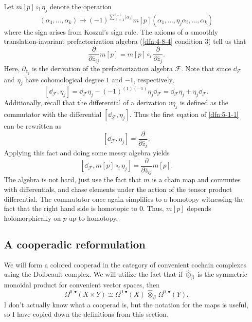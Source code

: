 Let $m[p]\circ _i \eta _j$ denote the operation
\[
	(\alpha _1, \ldots , \alpha _k) \mapsto (-1)^{\sum_{\ell=1}^{i-1} \left| \alpha _\ell  \right| } m[p](\alpha _1, \ldots , \eta _j\alpha _i, \ldots ,\alpha _k)
\]
where the sign arises from Koszul's sign rule. The axioms of a smoothly translation-invariant prefactorization algebra (\cref{dfn:4-8-4} condition 3) tell us that
\[
	\frac{\partial }{\partial \overline{z} _{ij} } m[p] = m[p]\circ _i \frac{\partial }{\partial \overline{z} _{j} } 
.\]
Here, $\partial _{\overline{z} _j} $ is the derivation of the prefactorization algebra $\mathcal{F} $. Note that since $\dd_{\mathcal{F} }$ and $\eta _j$ have cohomological degree $1$ and $-1$, respectively,
\[
	[\dd_{\mathcal{F} },\eta _j] = \dd_{\mathcal{F} }\eta _j - (-1)^{(1)(-1)} \eta _j \dd_{\mathcal{F} } = \dd_{\mathcal{F} } \eta _j + \eta _j \dd_{\mathcal{F} } 
.\]
Additionally, recall that the differential of a derivation $\dd \eta _j$ is defined as the commutator with the differential $[\dd _{\mathcal{F} } ,\eta _j]$. Thus the first eqation of \cref{dfn:5-1-1} can be rewritten as
\[
	[\dd _{\mathcal{F} } ,\eta _j] = \frac{\partial }{\partial \overline{z} _j} 
.\]
Applying this fact and doing some messy algebra yields
\[
	[\dd _{\mathcal{F} } ,m[p]\circ_i\eta _j] = \frac{\partial }{\partial \overline{z} _{ij} } m[p]
.\]
The algebra is not hard, just use the fact that $m$ is a chain map and commutes with differentials, and chase elements under the action of the tensor product differential. The commutator once again simplifies to a homotopy witnessing the fact that the right hand side is homotopic to 0. Thus, $m[p]$ depends holomorphically on $p$ up to homotopy.

\subsection{A cooperadic reformulation}

We will form a colored cooperad in the category of convenient cochain complexes using the Dolbeault complex. We will utilize the fact that if $\widehat{\otimes }_\beta$ is the symmetric monoidal product for convenient vector spaces, then
\[
	\Omega ^{0,\bullet}(X\times Y) \cong \Omega^{0,\bullet}(X)\, \widehat{\otimes }_\beta \,\Omega ^{0,\bullet} (Y)
.\]
I don't actually know what a cooperad is, but the notation for the maps is useful, so I have copied down the definitions from this section.

